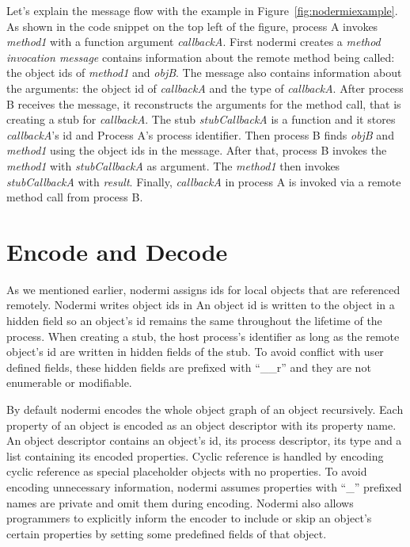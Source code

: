 Let's explain the message flow with the example 
in Figure~\ref{fig:nodermiexample}.
As shown in the code snippet on the top left of the figure,
process A invokes \emph{method1} with a function argument \emph{callbackA}.
First nodermi creates a \emph{method invocation message}
contains information about the remote method being called:
the object ids of \emph{method1} and \emph{objB}.
The message also contains information about the arguments:
the object id of \emph{callbackA} and 
the type of \emph{callbackA}.
After process B receives the message,
it reconstructs the arguments for the method call,
that is creating a stub for \emph{callbackA}.
The stub \emph{stubCallbackA} is a function and 
it stores \emph{callbackA}'s id and Process A's process identifier.
Then process B finds \emph{objB} and \emph{method1} using the 
object ids in the message.
After that,
process B invokes the \emph{method1} with \emph{stubCallbackA} as argument.
The \emph{method1} then invokes \emph{stubCallbackA} with \emph{result}.
Finally, \emph{callbackA} in process A
is invoked via a remote method call from process B.


\section{Encode and Decode}
As we mentioned earlier, nodermi assigns ids for local
objects that are referenced remotely.
Nodermi writes object ids in 
An object id is written to the object in a hidden field
so an object's id remains the same throughout the lifetime of the process.
When creating a stub,
the host process's identifier as long as the remote object's id
are written in hidden fields of the stub.
To avoid conflict with user defined fields, these hidden fields are prefixed
with ``\_\_r'' and they are not enumerable or modifiable.

By default nodermi encodes the whole object graph of an object recursively.
Each property of an object is encoded 
as an object descriptor with its property name.
An object descriptor contains an object's id, its process descriptor,
its type and a list containing its encoded properties.
Cyclic reference is handled by encoding cyclic reference as
special placeholder objects with no properties.
To avoid encoding unnecessary information,
nodermi assumes properties with ``\_'' prefixed names are private
 and omit them during encoding.
Nodermi also allows programmers to explicitly 
inform the encoder to include or skip 
an object's certain properties
by setting some predefined fields of that object.


